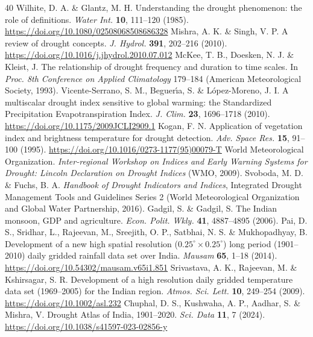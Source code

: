 \documentclass[10pt,a4paper]{article}
\begin{document}
\begin{thebibliography}{40}
\small
{} Wilhite, D. A. \& Glantz, M. H. Understanding the drought phenomenon: the role of definitions. \textit{Water Int.} \textbf{10}, 111--120 (1985). \url{https://doi.org/10.1080/02508068508686328}
 Mishra, A. K. \& Singh, V. P. A review of drought concepts. \textit{J. Hydrol.} \textbf{391}, 202--216 (2010). \url{https://doi.org/10.1016/j.jhydrol.2010.07.012}
 McKee, T. B., Doesken, N. J. \& Kleist, J. The relationship of drought frequency and duration to time scales. In \textit{Proc. 8th Conference on Applied Climatology} 179--184 (American Meteorological Society, 1993).
 Vicente-Serrano, S. M., Beguer\'{\i}a, S. \& L\'{o}pez-Moreno, J. I. A multiscalar drought index sensitive to global warming: the Standardized Precipitation Evapotranspiration Index. \textit{J. Clim.} \textbf{23}, 1696--1718 (2010). \url{https://doi.org/10.1175/2009JCLI2909.1}
 Kogan, F. N. Application of vegetation index and brightness temperature for drought detection. \textit{Adv. Space Res.} \textbf{15}, 91--100 (1995). \url{https://doi.org/10.1016/0273-1177(95)00079-T}
 World Meteorological Organization. \textit{Inter-regional Workshop on Indices and Early Warning Systems for Drought: Lincoln Declaration on Drought Indices} (WMO, 2009).
 Svoboda, M. D. \& Fuchs, B. A. \textit{Handbook of Drought Indicators and Indices}, Integrated Drought Management Tools and Guidelines Series 2 (World Meteorological Organization and Global Water Partnership, 2016).
 Gadgil, S. \& Gadgil, S. The Indian monsoon, GDP and agriculture. \textit{Econ. Polit. Wkly.} \textbf{41}, 4887--4895 (2006).
 Pai, D. S., Sridhar, L., Rajeevan, M., Sreejith, O. P., Satbhai, N. S. \& Mukhopadhyay, B. Development of a new high spatial resolution ($0.25^\circ\times0.25^\circ$) long period (1901--2010) daily gridded rainfall data set over India. \textit{Mausam} \textbf{65}, 1--18 (2014). \url{https://doi.org/10.54302/mausam.v65i1.851}
 Srivastava, A. K., Rajeevan, M. \& Kshirsagar, S. R. Development of a high resolution daily gridded temperature data set (1969--2005) for the Indian region. \textit{Atmos. Sci. Lett.} \textbf{10}, 249--254 (2009). \url{https://doi.org/10.1002/asl.232}
 Chuphal, D. S., Kushwaha, A. P., Aadhar, S. \& Mishra, V. Drought Atlas of India, 1901--2020. \textit{Sci. Data} \textbf{11}, 7 (2024). \url{https://doi.org/10.1038/s41597-023-02856-y}

\end{thebibliography}
\end{document}

